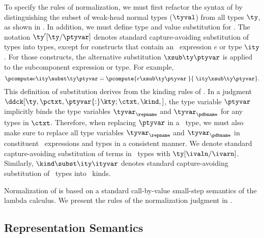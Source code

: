 To specify the rules of normalization, we must first refactor
the syntax of \ddc{} by distinguishing the subset of weak-head normal
types ($\tyval$) from all types $\ty$, as shown
in .
In addition, we must define type and value substitution for \ddc{}.
The notation $\ty'[\ty/\ptyvar]$ denotes standard capture-avoiding
substitution of types into types,
except for constructs that contain an \fomega\ expression $e$ or type
$\ity$. For those constructs, the alternative substitution $\xsub \ty
\ptyvar$ is applied to the subcomponent expression or type. For
example, 
\[
\pcompute e \ity \subst \ty \ptyvar = \pcompute {e\xsub \ty \ptyvar\;}
{\;\ity \xsub \ty \ptyvar}.
\] 
This definition of substitution derives from the kinding rules of
\ddc{}. In a judgment
$\ddck[\ty,{\pctxt,\ptyvar{:}\kty;\ctxt},\kind,]$, the \ddc{} type
variable $\ptyvar$ implicitly binds the \fomega{} type variables
$\tyvar_\repname$ and $\tyvar_\pdbname$ for any types in $\ctxt$.
Therefore, when replacing $\ptyvar$ in a \ddc\ type, we must also make
sure to replace all type variables $\tyvar_\repname$ and
$\tyvar_\pdbname$ in constituent \fomega\ expressions and types in a
consistent manner. We denote standard capture-avoiding substitution of terms in \ddc\
types with $\ty[\ivaln/\ivarn]$. Similarly, $\kind\subst \ity \ityvar$
denotes standard capture-avoiding substitution of \fomega\ types into
\ddc\ kinds.

Normalization of \ddc{} is based on a standard call-by-value
small-step semantics of the lambda calculus. We present the rules of
the normalization judgment in \figref{fig:ddc-reduction-rules}.

\subsection{Representation Semantics}
\label{sec:intty-sem}

